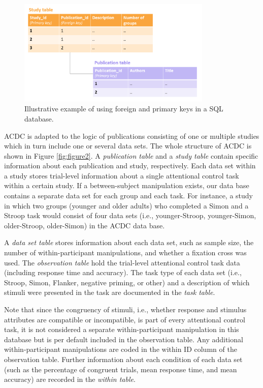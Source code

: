 \documentclass[
  man,floatsintext]{apa6}
\begin{document}
\begin{figure}

{\centering \includegraphics[width=350px]{images/illustrate_SQL_keys} 

}

\caption{Illustrative example of using foreign and primary keys in a SQL database.}\label{fig:figure1}
\end{figure}

ACDC is adapted to the logic of publications consisting of one or multiple studies which in turn include one or several data sets. The whole structure of ACDC is shown in Figure \ref{fig:figure2}. A \emph{publication table} and a \emph{study table} contain specific information about each publication and study, respectively. Each data set within a study stores trial-level information about a single attentional control task within a certain study. If a between-subject manipulation exists, our data base contains a separate data set for each group and each task. For instance, a study in which two groups (younger and older adults) who completed a Simon and a Stroop task would consist of four data sets (i.e., younger-Stroop, younger-Simon, older-Stroop, older-Simon) in the ACDC data base.

A \emph{data set table} stores information about each data set, such as sample size, the number of within-participant manipulations, and whether a fixation cross was used. The \emph{observation table} hold the trial-level attentional control task data (including response time and accuracy). The task type of each data set (i.e., Stroop, Simon, Flanker, negative priming, or other) and a description of which stimuli were presented in the task are documented in the \emph{task table}.

Note that since the congruency of stimuli, i.e., whether response and stimulus attributes are compatible or incompatible, is part of every attentional control task, it is not considered a separate within-participant manipulation in this database but is per default included in the observation table. Any additional within-participant manipulations are coded in the within ID column of the observation table. Further information about each condition of each data set (such as the percentage of congruent trials, mean response time, and mean accuracy) are recorded in the \emph{within table}.
\end{document}

